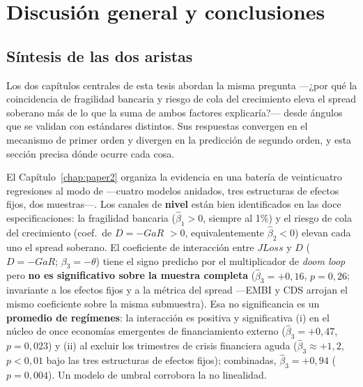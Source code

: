 \chapter{Discusión general y conclusiones}
\label{chap:discusion}

\section{Síntesis de las dos aristas}

Los dos capítulos centrales de esta tesis abordan la misma pregunta —¿por qué la coincidencia de fragilidad bancaria y riesgo de cola del crecimiento eleva el spread soberano más de lo que la suma de ambos factores explicaría?— desde ángulos que se validan con estándares distintos. Sus respuestas convergen en el mecanismo de primer orden y divergen en la predicción de segundo orden, y esta sección precisa dónde ocurre cada cosa.

El Capítulo~\ref{chap:paper2} organiza la evidencia en una batería de veinticuatro regresiones al modo de \citet{Chari2024} —cuatro modelos anidados, tres estructuras de efectos fijos, dos muestras—. Los canales de \textbf{nivel} están bien identificados en las doce especificaciones: la fragilidad bancaria ($\hat\beta_1>0$, siempre al 1\%) y el riesgo de cola del crecimiento (coef.\ de $D=-GaR$ $>0$, equivalentemente $\hat\beta_2<0$) elevan cada uno el spread soberano. El coeficiente de interacción entre $JLoss$ y $D$ ($D=-GaR$; $\beta_3=-\theta$) tiene el signo predicho por el multiplicador de \textit{doom loop} pero \textbf{no es significativo sobre la muestra completa} ($\hat\beta_3=+0{,}16$, $p=0{,}26$; invariante a los efectos fijos y a la métrica del spread —EMBI y CDS arrojan el mismo coeficiente sobre la misma submuestra). Esa no significancia es un \textbf{promedio de regímenes}: la interacción es positiva y significativa (i) en el núcleo de once economías emergentes de financiamiento externo ($\hat\beta_3=+0{,}47$, $p=0{,}023$) y (ii) al excluir los trimestres de crisis financiera aguda ($\hat\beta_3\approx+1{,}2$, $p<0{,}01$ bajo las tres estructuras de efectos fijos); combinadas, $\hat\beta_3=+0{,}94$ ($p=0{,}004$). Un modelo de umbral corrobora la no linealidad.


